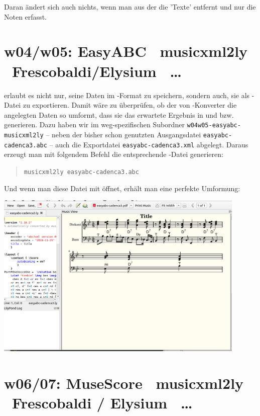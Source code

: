 Daran ändert sich auch nichts, wenn man aus der  die 'Texte'
entfernt und nur die Noten erfasst. 

\section{w04/w05: Easy\-ABC \ra\ musicxml2ly  \ra\ Frescobaldi/Elysium \ra\ \ldots}\label{w0405}

 erlaubt es nicht nur, seine Daten im -Format zu
speichern, sondern auch, sie als -Datei zu exportieren. Damit wäre
zu überprüfen, ob der von -Konverter  die
angelegten Daten so umformt, dass sie das erwartete Ergebnis in
 und  bzw.  generieren. Dazu haben
wir im weg-spezifischen Subordner \texttt{w04w05-easyabc-musicxml2ly} -- neben der
bisher schon genutzten Ausgangsdatei \texttt{easyabc-cadenca3.abc} -- auch die
Exportdatei \texttt{easyabc-cadenca3.xml} abgelegt. Daraus erzeugt man mit
folgendem Befehl die entsprechende -Datei generieren:

\begin{quote}\texttt{musicxml2ly easyabc-cadenca3.abc}\end{quote}

Und wenn man diese Datei mit  öffnet, erhält man eine perfekte
Umformung:

\begin{center}
\includegraphics[width=0.9\textwidth]{frontends/easyabc/easyabc-musicxml-frescobaldi.png}
\end{center}

\section{w06/07: Muse\-Score \ra\ musicxml2ly \ra\ Frescobaldi / Elysium \ra\ \ldots}\label{w0607}

